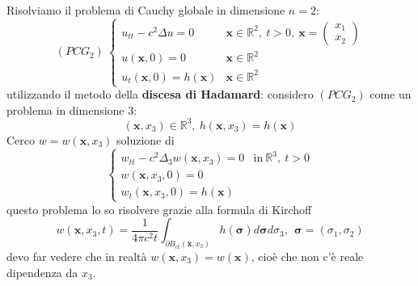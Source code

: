 \documentclass[10pt,a4paper,twoside,openright]{book}
\begin{document}
Risolviamo il problema di Cauchy globale in dimensione $\displaystyle n=2$:
\begin{equation*}
	( PCG_{2}) \ 
	\begin{cases}
		u_{tt} -c^{2} \Delta u=0            & \mathbf{x} \in \mathbb{R}^{2} ,\ t >0,\ \mathbf{x} = 
		\begin{pmatrix}
		x_{1}\\
		x_{2}
		\end{pmatrix}\\
		u(\mathbf{x} ,0) =0                 & \mathbf{x}\mathbb{\in R}^{2}                         \\
		u_{t}(\mathbf{x} ,0) =h(\mathbf{x}) & \mathbf{x}\mathbb{\in R}^{2}                         
	\end{cases}
\end{equation*}
utilizzando il metodo della \textbf{discesa di Hadamard}: considero $\displaystyle ( PCG_{2})$ come un problema in dimensione $\displaystyle 3$:
\begin{equation}
	(\mathbf{x} ,x_{3}) \in \mathbb{R}^{3} ,\ h(\mathbf{x} ,x_{3}) =h(\mathbf{x})
\end{equation}
Cerco $\displaystyle w=w(\mathbf{x} ,x_{3})$ soluzione di
\begin{equation*}
	\begin{cases}
		w_{tt} -c^{2} \Delta _{3} w(\mathbf{x} ,x_{3}) =0 & \text{in} \ \mathbb{R}^{3} ,\ t >0 \\
		w(\mathbf{x} ,x_{3} ,0) =0                        &                                    \\
		w_{t}(\mathbf{x} ,x_{3} ,0) =h(\mathbf{x})        &                                    
	\end{cases}
\end{equation*}
questo problema lo so risolvere grazie alla formula di Kirchoff
\begin{equation*}
	w(\mathbf{x} ,x_{3} ,t) =\frac{1}{4\pi c^{2} t}\int _{\partial B_{ct}(\mathbf{x} ,x_{3})} h(\bm{\sigma }) d\bm{\sigma } d\sigma _{3} ,\ \ \bm{\sigma } =( \sigma _{1} ,\sigma _{2})
\end{equation*}
devo far vedere che in realtà $\displaystyle w(\mathbf{x} ,x_{3}) =w(\mathbf{x})$, cioè che non c'è reale dipendenza da $\displaystyle x_{3}$.
\end{document}
